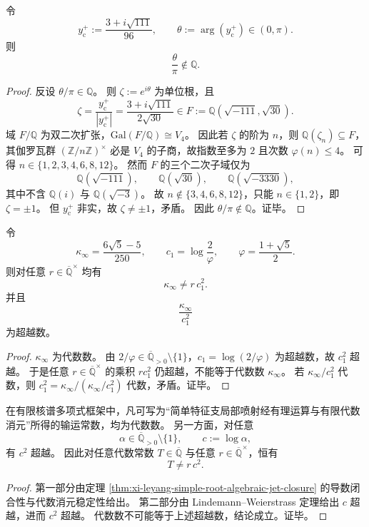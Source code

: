 \begin{proposition}\label{prop:xi-leyang-angle-over-pi-irrational}
令
\[
y_{\mathrm c}^{+}:=\frac{3+i\sqrt{111}}{96},
\qquad
\theta:=\arg(y_{\mathrm c}^{+})\in(0,\pi).
\]
则
\[
\frac{\theta}{\pi}\notin\mathbb Q.
\]
\end{proposition}
\begin{proof}
反设 \(\theta/\pi\in\mathbb Q\)。
则 \(\zeta:=e^{i\theta}\) 为单位根，且
\[
\zeta=\frac{y_{\mathrm c}^{+}}{|y_{\mathrm c}^{+}|}
=\frac{3+i\sqrt{111}}{2\sqrt{30}}
\in F:=\mathbb Q(\sqrt{-111},\sqrt{30}).
\]
域 \(F/\mathbb Q\) 为双二次扩张，\(\mathrm{Gal}(F/\mathbb Q)\cong V_4\)。
因此若 \(\zeta\) 的阶为 \(n\)，则 \(\mathbb Q(\zeta_n)\subseteq F\)，其伽罗瓦群 \((\mathbb Z/n\mathbb Z)^{\times}\) 必是 \(V_4\) 的子商，故指数至多为 \(2\) 且次数 \(\varphi(n)\le4\)。
可得 \(n\in\{1,2,3,4,6,8,12\}\)。
然而 \(F\) 的三个二次子域仅为
\[
\mathbb Q(\sqrt{-111}),\qquad
\mathbb Q(\sqrt{30}),\qquad
\mathbb Q(\sqrt{-3330}),
\]
其中不含 \(\mathbb Q(i)\) 与 \(\mathbb Q(\sqrt{-3})\)。
故 \(n\notin\{3,4,6,8,12\}\)，只能 \(n\in\{1,2\}\)，即 \(\zeta=\pm1\)。
但 \(y_{\mathrm c}^{+}\) 非实，故 \(\zeta\neq\pm1\)，矛盾。
因此 \(\theta/\pi\notin\mathbb Q\)。证毕。
\end{proof}

\begin{theorem}\label{thm:xi-leyang-kappa-vs-c1-square-obstruction}
令
\[
\kappa_{\infty}=\frac{6\sqrt5-5}{250},
\qquad
c_1=\log\!\frac{2}{\varphi},
\qquad
\varphi=\frac{1+\sqrt5}{2}.
\]
则对任意 \(r\in\overline{\mathbb Q}^{\times}\) 均有
\[
\kappa_{\infty}\neq r\,c_1^2.
\]
并且
\[
\frac{\kappa_{\infty}}{c_1^2}
\]
为超越数。
\end{theorem}
\begin{proof}
\(\kappa_{\infty}\) 为代数数。
由 \(2/\varphi\in\overline{\mathbb Q}_{>0}\setminus\{1\}\)，\(c_1=\log(2/\varphi)\) 为超越数，故 \(c_1^2\) 超越。
于是任意 \(r\in\overline{\mathbb Q}^{\times}\) 的乘积 \(r c_1^2\) 仍超越，不能等于代数数 \(\kappa_{\infty}\)。
若 \(\kappa_{\infty}/c_1^2\) 代数，则 \(c_1^2=\kappa_{\infty}/(\kappa_{\infty}/c_1^2)\) 代数，矛盾。证毕。
\end{proof}

\begin{corollary}[代数输运常数与对数熵常数之间不存在闭合平方律]\label{cor:xi-leyang-algebraic-transport-vs-log-entropy-no-square-law}
在有限核谱多项式框架中，凡可写为“简单特征支局部喷射经有理运算与有限代数消元”所得的输运常数，均为代数数。
另一方面，对任意
\[
\alpha\in\overline{\mathbb Q}_{>0}\setminus\{1\},
\qquad
c:=\log\alpha,
\]
有 \(c^2\) 超越。
因此对任意代数常数 \(T\in\overline{\mathbb Q}\) 与任意 \(r\in\overline{\mathbb Q}^{\times}\)，恒有
\[
T\neq r\,c^2.
\]
\end{corollary}
\begin{proof}
第一部分由定理 \ref{thm:xi-leyang-simple-root-algebraic-jet-closure} 的导数闭合性与代数消元稳定性给出。
第二部分由 Lindemann--Weierstrass 定理给出 \(c\) 超越，进而 \(c^2\) 超越。
代数数不可能等于上述超越数，结论成立。证毕。
\end{proof}


